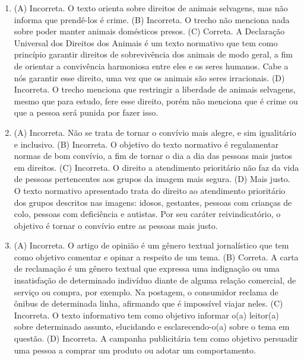 
\begin{enumerate}
\item (A) Incorreta. O texto orienta sobre direitos de animais selvagens,
mas não informa que prendê-los é crime.
(B) Incorreta. O trecho não menciona nada sobre poder manter animais
domésticos presos.
(C) Correta. A Declaração Universal dos Direitos dos Animais é um texto normativo que
tem como princípio garantir direitos de sobrevivência dos animais de
modo geral, a fim de orientar a convivência harmoniosa entre eles e os
seres humanos. Cabe a nós garantir esse direito, uma vez que os animais
são seres irracionais.
(D) Incorreta. O trecho menciona que restringir a liberdade de animais
selvagens, mesmo que para estudo, fere esse direito, porém não menciona
que é crime ou que a pessoa será punida por fazer isso.

\item (A) Incorreta. Não se trata de tornar o convívio mais alegre, e sim
igualitário e inclusivo.
(B) Incorreta. O objetivo do texto normativo é regulamentar normas de
bom convívio, a fim de tornar o dia a dia das pessoas mais justos em
direitos.
(C) Incorreta. O direito a atendimento prioritário não faz da vida de
pessoas pertencentes aos grupos da imagem mais segura.
(D) Mais justo. O texto normativo apresentado trata do direito ao atendimento
prioritário dos grupos descritos nas imagens: idosos, gestantes, pessoas
com crianças de colo, pessoas com deficiência e autistas. Por seu
caráter reivindicatório, o objetivo é tornar o convívio entre as pessoas
mais justo.

\item (A) Incorreta. O artigo de opinião é um gênero textual jornalístico que
tem como objetivo comentar e opinar a respeito de um tema.
(B) Correta. A carta de reclamação é um gênero textual que expressa uma indignação ou
uma insatisfação de determinado indivíduo diante de alguma relação
comercial, de serviço ou compra, por exemplo. Na postagem, o consumidor
reclama de ônibus de determinada linha, afirmando que é impossível
viajar neles.
(C) Incorreta. O texto informativo tem como objetivo informar o(a)
leitor(a) sobre determinado assunto, elucidando e esclarecendo-o(a)
sobre o tema em questão.
(D) Incorreta. A campanha publicitária tem como objetivo persuadir uma
pessoa a comprar um produto ou adotar um comportamento.
\end{enumerate}


